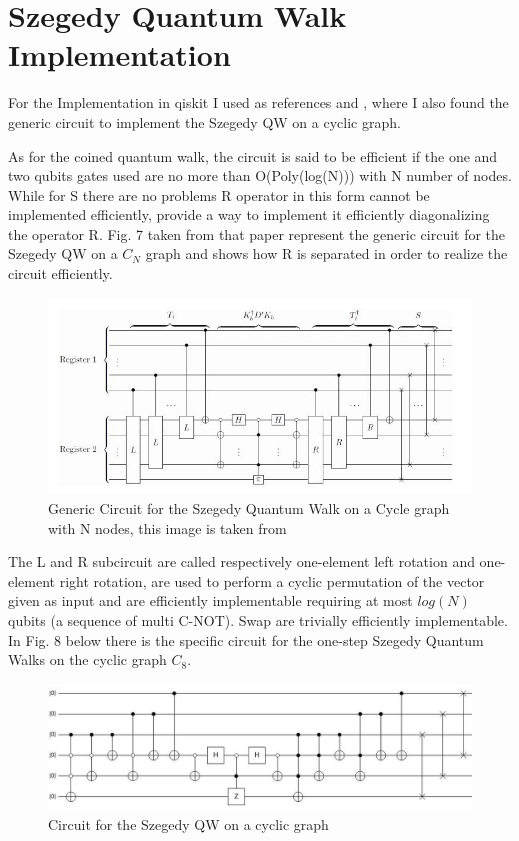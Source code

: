 \section{Szegedy Quantum Walk Implementation}

For the Implementation in qiskit I used as references \cite{Loke_2017} and \cite{c2dacf48ddf341aca084f825d3787894}, where I also found the generic circuit 
to implement the Szegedy QW on a cyclic graph.

As for the coined quantum walk, the circuit is said to be efficient if the one and two qubits gates used are no more than O(Poly(log(N))) with N number of nodes. 
While for S there are no problems R operator in this
form cannot be implemented efficiently, \cite{Loke_2017} provide a way to implement it efficiently diagonalizing the operator R. Fig. 7 taken from that
paper represent the generic circuit for the Szegedy QW on a $C_{N}$ graph and shows how R is separated in order to realize the circuit efficiently. 


\begin{figure}[h!]
    \centering   
    \includegraphics[scale=0.4]{img/generic_szegedy.jpg}
    \caption{Generic Circuit for the Szegedy Quantum Walk on a Cycle graph with N nodes, this image is taken from}
\end{figure}

The L and R subcircuit are called respectively one-element left rotation and one-element right rotation, are used to perform a cyclic permutation
of the vector given as input and are efficiently implementable requiring at most $log(N)$ qubits (a sequence of multi C-NOT). Swap are trivially 
efficiently implementable. In Fig. 8 below there is the specific circuit for the one-step Szegedy Quantum Walks on the cyclic graph $C_{8}$.

\begin{figure}[h!]
    \centering   
    \includegraphics[scale=0.25]{img/szegedy_c8.jpg}
    \caption{Circuit for the Szegedy QW on a cyclic graph}
\end{figure}

